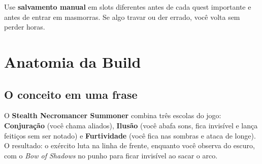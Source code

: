 \documentclass[11pt,a4paper,oneside,openany]{book}
\newcommand{\objeto}[1]{\textit{\textcolor{NecroEmerald}{#1}}}
\begin{document}
\begin{dica}
Use \textbf{salvamento manual} em slots diferentes antes de cada quest importante e antes de entrar em masmorras. Se algo travar ou der errado, você volta sem perder horas.
\end{dica}


\chapter{Anatomia da Build}

\section{O conceito em uma frase}
O \textbf{Stealth Necromancer Summoner} combina três escolas do jogo: \textbf{Conjuração} (você chama aliados), \textbf{Ilusão} (você abafa sons, fica invisível e lança feitiços sem ser notado) e \textbf{Furtividade} (você fica nas sombras e ataca de longe). O resultado: o exército luta na linha de frente, enquanto você observa do escuro, com o \objeto{Bow of Shadows} no punho para ficar invisível ao sacar o arco.
\end{document}
